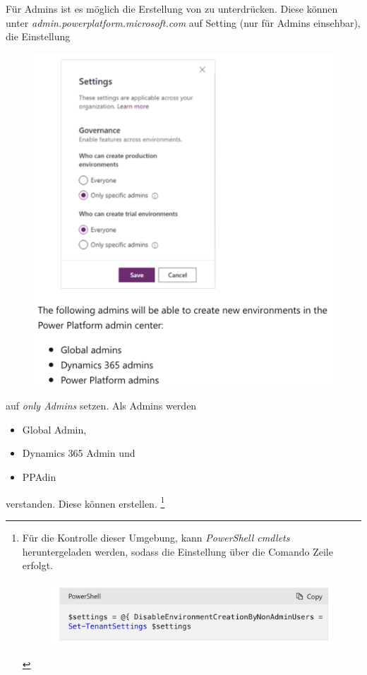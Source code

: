 Für Admins ist es möglich die Erstellung von \Env zu unterdrücken. Diese können unter \textit{admin.powerplatform.microsoft.com} auf Setting (nur für Admins einsehbar), die Einstellung
\begin{figure}[H]
	\centering
	\includegraphics[scale = 0.3]{attachment/chapter_13/Scc020}
\end{figure}
auf \textit{only Admins} setzen. Als Admins werden 
\begin{itemize}
	\item Global Admin,
	\item Dynamics 365 Admin und
	\item \gls{PP}Adin
\end{itemize}
verstanden. Diese können \Env erstellen. \footnote{Für die Kontrolle dieser Umgebung, kann \textit{PowerShell cmdlets} heruntergeladen werden, sodass die Einstellung über die Comando Zeile erfolgt. \begin{figure}[H]
		\centering
		\includegraphics[scale = 0.3]{attachment/chapter_13/Scc021}
\end{figure}}

